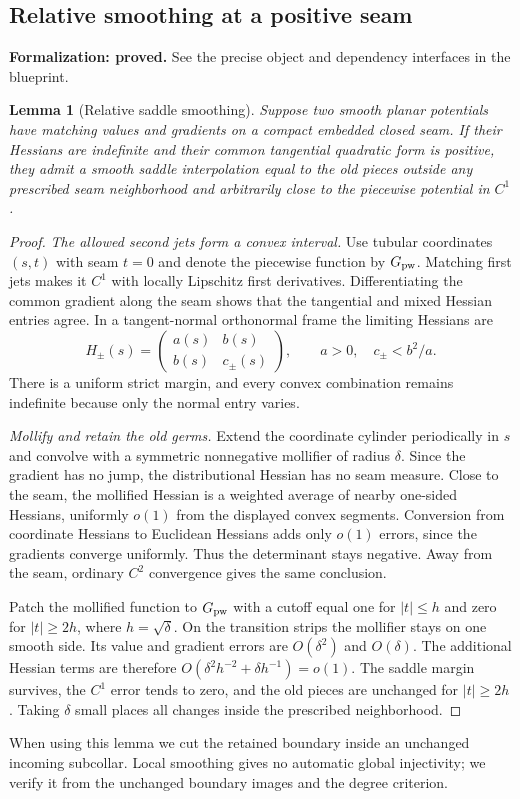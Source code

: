 \documentclass[11pt]{amsart}
\newtheorem{lemma}[theorem]{Lemma}
\theoremstyle{definition}
\theoremstyle{remark}
\numberwithin{equation}{section}
\begin{document}
\subsection{Relative smoothing at a positive seam}
\par\noindent\textbf{Formalization: proved.} See the precise object and dependency interfaces in the blueprint.\par
\begin{lemma}[Relative saddle smoothing]\label{lem:smoothing}
Suppose two smooth planar potentials have matching values and gradients
on a compact embedded closed seam. If their Hessians are indefinite and
their common tangential quadratic form is positive, they admit a smooth
saddle interpolation equal to the old pieces outside any prescribed seam
neighborhood and arbitrarily close to the piecewise potential in $C^1$.
\end{lemma}
\begin{proof}
\emph{The allowed second jets form a convex interval.}
Use tubular coordinates $(s,t)$ with seam $t=0$ and denote the piecewise
function by $G_{\rm pw}$. Matching first jets makes it $C^1$ with locally
Lipschitz first derivatives. Differentiating the common gradient along
the seam shows that the tangential and mixed Hessian entries agree.
In a tangent-normal orthonormal frame the limiting Hessians are
\[
 H_\pm(s)=\begin{pmatrix}a(s)&b(s)\\b(s)&c_\pm(s)\end{pmatrix},
 \qquad a>0,\quad c_\pm<b^2/a.
\]
There is a uniform strict margin, and every convex combination remains
indefinite because only the normal entry varies.

\emph{Mollify and retain the old germs.}
Extend the coordinate cylinder periodically in $s$ and convolve with a
symmetric nonnegative mollifier of radius $\delta$. Since the gradient
has no jump, the distributional Hessian has no seam measure. Close to
the seam, the mollified Hessian is a weighted average of nearby one-sided
Hessians, uniformly $o(1)$ from the displayed convex segments. Conversion
from coordinate Hessians to Euclidean Hessians adds only $o(1)$ errors,
since the gradients converge uniformly. Thus the determinant stays negative.
Away from the seam, ordinary $C^2$ convergence gives the same conclusion.

Patch the mollified function to $G_{\rm pw}$ with a cutoff equal one for
$|t|\le h$ and zero for $|t|\ge2h$, where $h=\sqrt\delta$.
On the transition strips the mollifier stays on one smooth side.
Its value and gradient errors are $O(\delta^2)$ and $O(\delta)$.
The additional Hessian terms are therefore
$O(\delta^2h^{-2}+\delta h^{-1})=o(1)$. The saddle margin survives,
the $C^1$ error tends to zero, and the old pieces are unchanged for
$|t|\ge2h$. Taking $\delta$ small places all changes inside the prescribed
neighborhood.
\end{proof}
When using this lemma we cut the retained boundary inside an unchanged
incoming subcollar. Local smoothing gives no automatic global injectivity;
we verify it from the unchanged boundary images and the degree criterion.
\end{document}
